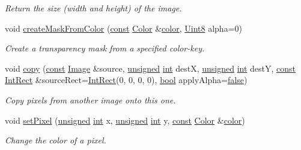 \begin{DoxyCompactItemize}
\begin{DoxyCompactList}\small\item\em Return the size (width and height) of the image. \end{DoxyCompactList}\item 
void \hyperlink{classsf_1_1_image_a22f13f8c242a6b38eb73cc176b37ae34}{create\-Mask\-From\-Color} (\hyperlink{term__entry_8h_a57bd63ce7f9a353488880e3de6692d5a}{const} \hyperlink{classsf_1_1_color}{Color} \&\hyperlink{_entity_8cpp_a864889304a90873adb9c6e289a54bcf4}{color}, \hyperlink{namespacesf_a4ef3d630785c4f296f9b4f274c33d78e}{Uint8} alpha=0)
\begin{DoxyCompactList}\small\item\em Create a transparency mask from a specified color-\/key. \end{DoxyCompactList}\item 
void \hyperlink{classsf_1_1_image_ab2fa337c956f85f93377dcb52153a45a}{copy} (\hyperlink{term__entry_8h_a57bd63ce7f9a353488880e3de6692d5a}{const} \hyperlink{classsf_1_1_image}{Image} \&source, \hyperlink{curses_8priv_8h_aca40206900cfc164654362fa8d4ad1e6}{unsigned} \hyperlink{term__entry_8h_ad65b480f8c8270356b45a9890f6499ae}{int} dest\-X, \hyperlink{curses_8priv_8h_aca40206900cfc164654362fa8d4ad1e6}{unsigned} \hyperlink{term__entry_8h_ad65b480f8c8270356b45a9890f6499ae}{int} dest\-Y, \hyperlink{term__entry_8h_a57bd63ce7f9a353488880e3de6692d5a}{const} \hyperlink{namespacesf_a1b1279ab06950b96686cffaacb72fed5}{Int\-Rect} \&source\-Rect=\hyperlink{namespacesf_a1b1279ab06950b96686cffaacb72fed5}{Int\-Rect}(0, 0, 0, 0), \hyperlink{term__entry_8h_a002004ba5d663f149f6c38064926abac}{bool} apply\-Alpha=\hyperlink{_snake_8cpp_ae6c865df784842196d411c1466b01686}{false})
\begin{DoxyCompactList}\small\item\em Copy pixels from another image onto this one. \end{DoxyCompactList}\item 
void \hyperlink{classsf_1_1_image_a9fd329b8cd7d4439e07fb5d3bb2d9744}{set\-Pixel} (\hyperlink{curses_8priv_8h_aca40206900cfc164654362fa8d4ad1e6}{unsigned} \hyperlink{term__entry_8h_ad65b480f8c8270356b45a9890f6499ae}{int} x, \hyperlink{curses_8priv_8h_aca40206900cfc164654362fa8d4ad1e6}{unsigned} \hyperlink{term__entry_8h_ad65b480f8c8270356b45a9890f6499ae}{int} y, \hyperlink{term__entry_8h_a57bd63ce7f9a353488880e3de6692d5a}{const} \hyperlink{classsf_1_1_color}{Color} \&\hyperlink{_entity_8cpp_a864889304a90873adb9c6e289a54bcf4}{color})
\begin{DoxyCompactList}\small\item\em Change the color of a pixel. \end{DoxyCompactList}\item 

\end{DoxyCompactItemize}

